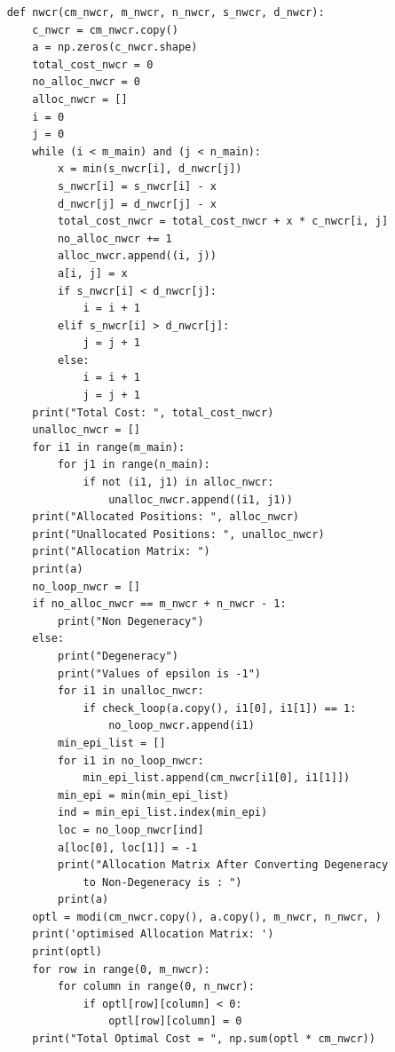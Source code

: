 \documentclass[12pt, letterpaper, twoside]{book}
\begin{document}
\begin{lstlisting}
	def nwcr(cm_nwcr, m_nwcr, n_nwcr, s_nwcr, d_nwcr):
		c_nwcr = cm_nwcr.copy()
		a = np.zeros(c_nwcr.shape)
		total_cost_nwcr = 0
		no_alloc_nwcr = 0
		alloc_nwcr = []
		i = 0
		j = 0
		while (i < m_main) and (j < n_main):
			x = min(s_nwcr[i], d_nwcr[j])
			s_nwcr[i] = s_nwcr[i] - x
			d_nwcr[j] = d_nwcr[j] - x
			total_cost_nwcr = total_cost_nwcr + x * c_nwcr[i, j]
			no_alloc_nwcr += 1
			alloc_nwcr.append((i, j))
			a[i, j] = x
			if s_nwcr[i] < d_nwcr[j]:
				i = i + 1
			elif s_nwcr[i] > d_nwcr[j]:
				j = j + 1
			else:
				i = i + 1
				j = j + 1
		print("Total Cost: ", total_cost_nwcr)
		unalloc_nwcr = []
		for i1 in range(m_main):
			for j1 in range(n_main):
				if not (i1, j1) in alloc_nwcr:
					unalloc_nwcr.append((i1, j1))
		print("Allocated Positions: ", alloc_nwcr)
		print("Unallocated Positions: ", unalloc_nwcr)
		print("Allocation Matrix: ")
		print(a)
		no_loop_nwcr = []
		if no_alloc_nwcr == m_nwcr + n_nwcr - 1:
			print("Non Degeneracy")
		else:
			print("Degeneracy")
			print("Values of epsilon is -1")
			for i1 in unalloc_nwcr:
				if check_loop(a.copy(), i1[0], i1[1]) == 1:
					no_loop_nwcr.append(i1)
			min_epi_list = []
			for i1 in no_loop_nwcr:
				min_epi_list.append(cm_nwcr[i1[0], i1[1]])
			min_epi = min(min_epi_list)
			ind = min_epi_list.index(min_epi)
			loc = no_loop_nwcr[ind]
			a[loc[0], loc[1]] = -1
			print("Allocation Matrix After Converting Degeneracy 
				to Non-Degeneracy is : ")
			print(a)
		optl = modi(cm_nwcr.copy(), a.copy(), m_nwcr, n_nwcr, )
		print('optimised Allocation Matrix: ')
		print(optl)
		for row in range(0, m_nwcr):
			for column in range(0, n_nwcr):
				if optl[row][column] < 0:
					optl[row][column] = 0
		print("Total Optimal Cost = ", np.sum(optl * cm_nwcr))


\end{lstlisting}
\end{document}
